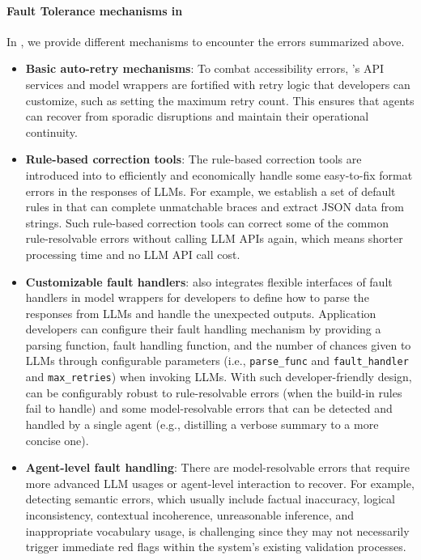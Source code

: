 \paragraph{Fault Tolerance mechanisms in \ours}
In \ours, we provide different mechanisms to encounter the errors summarized above.
\begin{itemize}
    \item 
    \textbf{Basic auto-retry mechanisms}:
    To combat accessibility errors, \ours's API services and model wrappers are fortified with retry logic that developers can customize, such as setting the maximum retry count. This ensures that agents can recover from sporadic disruptions and maintain their operational continuity.
    \item 
    \textbf{Rule-based correction tools}:
    The rule-based correction tools are introduced into \ours to efficiently and economically handle some easy-to-fix format errors in the responses of LLMs.
    For example, we establish a set of default rules in \ours that can complete unmatchable braces and extract JSON data from strings. 
    Such rule-based correction tools can correct some of the common rule-resolvable errors without calling LLM APIs again, which means shorter processing time and no LLM API call cost.
    \item 
    \textbf{Customizable fault handlers}:
    \ours also integrates flexible interfaces of fault handlers in model wrappers for developers to define how to parse the responses from LLMs and handle the unexpected outputs.
    Application developers can configure their fault handling mechanism by providing a parsing function, fault handling function, and the number of chances given to LLMs through configurable parameters (i.e., \texttt{parse\_func} and \texttt{fault\_handler} and \texttt{max\_retries}) when invoking LLMs.
    With such developer-friendly design, \ours can be configurably robust to rule-resolvable errors (when the build-in rules fail to handle) and some model-resolvable errors that can be detected and handled by a single agent (e.g., distilling a verbose summary to a more concise one).
    \item 
    \textbf{Agent-level fault handling}:
    There are model-resolvable errors that require more advanced LLM usages or agent-level interaction to recover.
    For example, detecting semantic errors, which usually include factual inaccuracy, logical inconsistency, contextual incoherence, unreasonable inference, and inappropriate vocabulary usage, is challenging since they may not necessarily trigger immediate red flags within the system's existing validation processes. 

\end{itemize}
